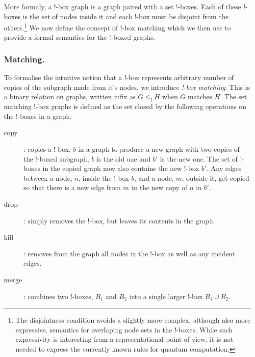 \documentclass[runningheads]{llncs}
\newcommand{\inlinegraphic}[2]{
  \dimendef\grafheight=255\dimendef\grafvshift=254
  \grafheight=#1
  \grafvshift=-0.5\grafheight
  \advance\grafvshift by 0.5ex
  \raisebox{\grafvshift}{\texttt{[image: images/\#2]}\xspace}
}
\begin{document}

More formaly, a !-box graph is a graph paired with a set !-boxes. Each
of these !-boxes is the set of nodes inside it and each !-box must be
disjoint from the others.\footnote{The disjointness condition avoids a
  slightly more complex, although also more expressive, semantics for
  overlaping node sets in the !-boxes. While such expressivity is
  interesting from a representational point of view, it is not needed
  to express the currently known rules for quantum computation.}  We
now define the concept of !-box matching which we then use to provide
a formal semantics for the !-boxed graphs.

\subsubsection{Matching.}

To formalise the intuitive notion that a !-box represents arbitrary
number of copies of the subgraph made from it's nodes, we introduce
\emph{!-box matching}. This is a binary relation on graphs, written
infix as $G \leq_! H$ when $G$ matches $H$. The set matching !-box
graphs is defined as the set closed by the following operations on the
!-boxes in a graph:

\begin{description}
  \item[copy]: copies a !-box, $b$ in a graph to produce a new graph
  with two copies of the !-boxed subgraph, $b$ is the old one and $b'$
  is the new one. The set of !-boxes in the copied graph now also
  contains the new !-box $b'$. Any edges between a node, $n$, inside
  the !-box $b$, and a node, $m$, outside it, get copied so that there
  is a new edge from $m$ to the new copy of $n$ in $b'$.

\item[drop]: simply removes the !-box, but leaves its contents in the
  graph.

\item[kill]: removes from the graph all nodes in the !-box as well as
  any incident edges.

\item[merge]: combines two !-boxes, $B_1$ and $B_2$ into a single
  larger !-box $B_1 \cup B_2$.
\end{description}
\end{document}
